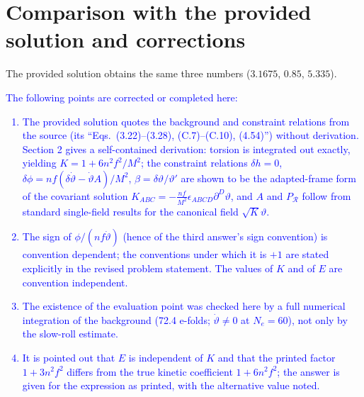 \documentclass[11pt]{article}
\newcommand{\chg}[1]{\textcolor{blue}{#1}}
\begin{document}
\section{Comparison with the provided solution and corrections}
The provided solution obtains the same three numbers ($3.1675$, $0.85$, $5.335$). \chg{The following points are corrected or completed here:
\begin{enumerate}
\item The provided solution quotes the background and constraint relations from the source (its ``Eqs.\ (3.22)--(3.28), (C.7)--(C.10), (4.54)'') without derivation. Section 2 gives a self-contained derivation: torsion is integrated out exactly, yielding $K=1+6n^2f^2/M^2$; the constraint relations $\delta h=0$, $\delta\phi=nf(\delta\dot\vartheta-\dot\vartheta A)/M^2$, $\beta=\delta\vartheta/\vartheta'$ are shown to be the adapted-frame form of the covariant solution $K_{ABC}=-\frac{nf}{M^2}\epsilon_{ABCD}\partial^D\vartheta$, and $A$ and $P_{\mathcal R}$ follow from standard single-field results for the canonical field $\sqrt K\vartheta$.
\item The sign of $\phi/(nf\dot\vartheta)$ (hence of the third answer's sign convention) is convention dependent; the conventions under which it is $+1$ are stated explicitly in the revised problem statement. The values of $K$ and of $E$ are convention independent.
\item The existence of the evaluation point was checked here by a full numerical integration of the background (72.4 e-folds; $\dot\vartheta\neq0$ at $N_e=60$), not only by the slow-roll estimate.
\item It is pointed out that $E$ is independent of $K$ and that the printed factor $1+3n^2f^2$ differs from the true kinetic coefficient $1+6n^2f^2$; the answer is given for the expression as printed, with the alternative value noted.
\end{enumerate}}
\end{document}
